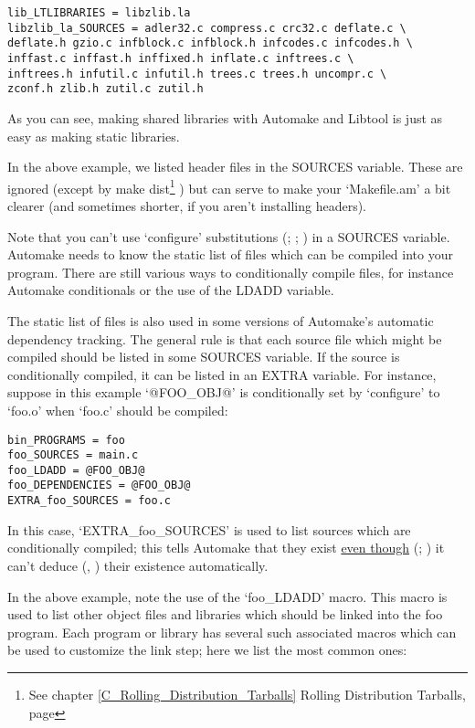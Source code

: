 \begin{Verbatim}[frame=single]
lib_LTLIBRARIES = libzlib.la
libzlib_la_SOURCES = adler32.c compress.c crc32.c deflate.c \
deflate.h gzio.c infblock.c infblock.h infcodes.c infcodes.h \
inffast.c inffast.h inffixed.h inflate.c inftrees.c \
inftrees.h infutil.c infutil.h trees.c trees.h uncompr.c \
zconf.h zlib.h zutil.c zutil.h
\end{Verbatim}

As you can see, making shared libraries with Automake and Libtool is just as easy as making static libraries. 


In the above example, we listed header files in the SOURCES variable. These 
are ignored (except by make 
dist\footnote{See chapter \ref{C_Rolling_Distribution_Tarballs} Rolling
Distribution Tarballs, page \pageref{C_Rolling_Distribution_Tarballs}} )
but can serve to make your `Makefile.am' a bit clearer (and 
sometimes shorter, if you aren't installing headers). 


Note that you can't use `configure' substitutions ({\MaQ\cH72}; {\MaQ{}}; {\MgQ{}}) in a 
SOURCES variable. Automake needs to know the static list of files which 
can be compiled into your program. There are still various ways to 
conditionally compile files, for instance Automake conditionals or the use of 
the LDADD variable. 


The static list of files is also used in some versions of Automake's automatic dependency tracking. The general rule is that each source file which might be compiled should be listed in some SOURCES variable. If the source is conditionally compiled, it can be listed in an EXTRA variable. For instance, suppose in this example `@FOO\_{}OBJ@' is conditionally set by `configure' to `foo.o' when `foo.c' should be compiled: 


\begin{Verbatim}[frame=single]
bin_PROGRAMS = foo
foo_SOURCES = main.c
foo_LDADD = @FOO_OBJ@
foo_DEPENDENCIES = @FOO_OBJ@
EXTRA_foo_SOURCES = foo.c
\end{Verbatim}

In this case, `EXTRA\_{}foo\_{}SOURCES' is used to list sources which are 
conditionally compiled; this tells Automake that they exist
\underline{even though} ({\MdQ{}}; {\McQ{}}) it can't 
deduce ({\MbQ{}}, {\MbQ{}}) their existence automatically. 


In the above example, note the use of the `foo\_{}LDADD' macro. This macro is 
used to list other object files and libraries which should be linked into 
the foo program. Each program or library has several such associated 
macros which can be used to customize the link step; here we list the 
most common ones: 

